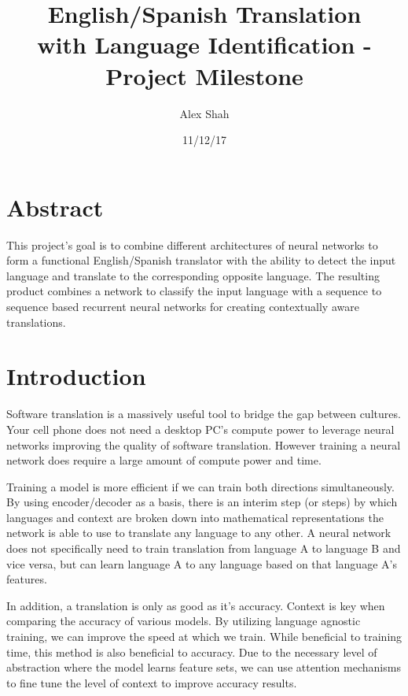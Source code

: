\documentclass[10pt,a4paper]{report}
\begin{document}
\title{English/Spanish Translation \\ with Language Identification - \\ Project Milestone}
\author{Alex Shah}
\date{11/12/17}

\maketitle

\section{Abstract}
This project's goal is to combine different architectures of neural networks to form a functional English/Spanish translator with the ability to detect the input language and translate to the corresponding opposite language. The resulting product combines a network to classify the input language with a sequence to sequence based recurrent neural networks for creating contextually aware translations.

\section{Introduction}
Software translation is a massively useful tool to bridge the gap between cultures. Your cell phone does not need a desktop PC's compute power to leverage neural networks improving the quality of software translation. However training a neural network does require a large amount of compute power and time. 

Training a model is more efficient if we can train both directions simultaneously. By using encoder/decoder as a basis, there is an interim step (or steps) by which languages and context are broken down into mathematical representations the network is able to use to translate any language to any other. A neural network does not specifically need to train translation from language A to language B and vice versa, but can learn language A to any language based on that language A's features. 

In addition, a translation is only as good as it's accuracy. Context is key when comparing the accuracy of various models. By utilizing language agnostic training, we can improve the speed at which we train. While beneficial to training time, this method is also beneficial to accuracy. Due to the necessary level of abstraction where the model learns feature sets, we can use attention mechanisms to fine tune the level of context to improve accuracy results.
\end{document}
